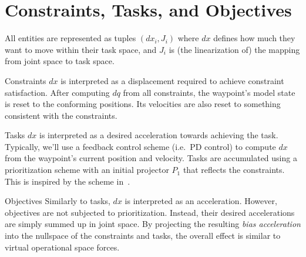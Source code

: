 \documentclass{article}
\begin{document}
\section{Constraints, Tasks, and Objectives}

All entities are represented as tuples $(dx_i, J_i)$ where $dx$ defines how much they want to move within their task space, and $J_i$ is (the linearization of) the mapping from joint space to task space.

\begin{compactdesc}
\item[Constraints]
  $dx$ is interpreted as a displacement required to achieve constraint satisfaction.
  After computing $dq$ from all constraints, the waypoint's model state is reset to the conforming positions.
  Its velocities are also reset to something consistent with the constraints.
\item[Tasks]
  $dx$ is interpreted as a desired acceleration towards achieving the task.
  Typically, we'll use a feedback control scheme (i.e.\ PD control) to compute $dx$ from the waypoint's current position and velocity.
  Tasks are accumulated using a prioritization scheme with an initial projector $P_1$ that reflects the constraints.
  This is inspired by the scheme in~\cite{baerlocher:2001}.
\item[Objectives]
  Similarly to tasks, $dx$ is interpreted as an acceleration.
  However, objectives are not subjected to prioritization.
  Instead, their desired accelerations are simply summed up in joint space.
  By projecting the resulting \emph{bias acceleration} into the nullspace of the constraints and tasks, the overall effect is similar to virtual operational space forces.
\end{compactdesc}



\footnotesize


\end{document}

